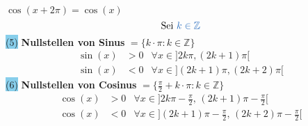 \documentclass[landscape, 10pt]{article}
\newcommand{\Z}{\mathbb{Z}}
\begin{document}
\begin{multicols}{3}
                            \textcolor{NavyBlue}{
                            $\cos(x+2\pi)=\cos(x)$}\\
                     \begin{equation*}
                            \text{Sei } \textcolor{NavyBlue}{k\in\Z}
                     \end{equation*}
                     \colorbox{SkyBlue}{(5)}
                            \textbf{Nullstellen von Sinus} 
                            \textcolor{NavyBlue}{
                            $=\{k\cdot\pi:k\in\Z\}$} 
                            \begin{align*}
                                   \sin(x)&>0
                                   &\forall x\in
                                   ]2k\pi,(2k+1)\pi[\\
                                   \sin(x)&<0
                                   &\forall x\in
                                   ](2k+1)\pi,(2k+2)\pi[
                            \end{align*}
                     \colorbox{SkyBlue}{(6)} 
                            \textbf{Nullstellen von Cosinus}
                            \textcolor{NavyBlue}{
                            $=\{\frac{\pi}{2}+k\cdot\pi:
                            k\in\Z\}$}
                            \begin{align*}
                                   \cos(x)&>0
                                   &\forall x\in
                                   ]2k\pi-\frac{\pi}{2},\,
                                   (2k+1)\pi-\frac{\pi}{2}[\\
                                   \cos(x)&<0
                                   &\forall x\in
                                   ](2k+1)\pi-\frac{\pi}{2},\,
                                   (2k+2)\pi-\frac{\pi}{2}[
                            \end{align*}

\end{multicols}
\end{document}
